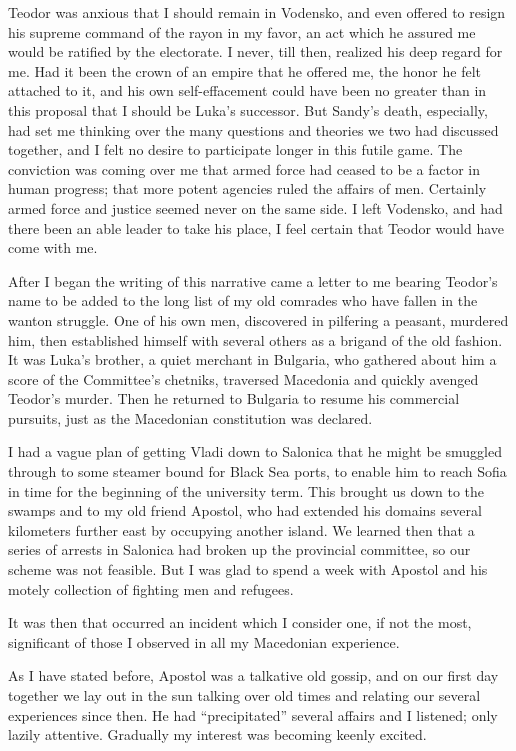 \documentclass[a5paper,12pt]{book}
\begin{document}
Teodor was anxious that I should remain in Vodensko, and even offered to resign his supreme command of the rayon in my favor, an act which he assured me would be ratified by the electorate. I never, till then, realized his deep regard for me. Had it been the crown of an empire that he offered me, the honor he felt attached to it, and his own self-effacement could have been no greater than in this proposal that I should be Luka’s successor. But Sandy’s death, especially, had set me thinking over the many questions and theories we two had discussed together, and I felt no desire to participate longer in this futile game. The conviction was coming over me that armed force had ceased to be a factor in human progress; that more potent agencies ruled the affairs of men. Certainly armed force and justice seemed never on the same side. I left Vodensko, and had there been an able leader to take his place, I feel certain that Teodor would have come with me. 

After I began the writing of this narrative came a letter to me bearing Teodor’s name to be added to the long list of my old comrades who have fallen in the wanton struggle. One of his own men, discovered in pilfering a peasant, murdered him, then established himself with several others as a brigand of the old fashion. It was Luka’s brother, a quiet merchant in Bulgaria, who gathered about him a score of the Committee’s chetniks, traversed Macedonia and quickly avenged Teodor’s murder. Then he returned to Bulgaria to resume his commercial pursuits, just as the Macedonian constitution was declared. 

I had a vague plan of getting Vladi down to Salonica that he might be smuggled through to some steamer bound for Black Sea ports, to enable him to reach Sofia in time for the beginning of the university term. This brought us down to the swamps and to my old friend Apostol, who had extended his domains several kilometers further east by occupying another island. We learned then that a series of arrests in Salonica had broken up the provincial committee, so our scheme was not feasible. But I was glad to spend a week with Apostol and his motely collection of fighting men and refugees. 

It was then that occurred an incident which I consider one, if not the most, significant of those I observed in all my Macedonian experience. 

As I have stated before, Apostol was a talkative old gossip, and on our first day together we lay out in the sun talking over old times and relating our several experiences since then. He had “precipitated” several affairs and I listened; only lazily attentive. Gradually my interest was becoming keenly excited. 
\end{document}
